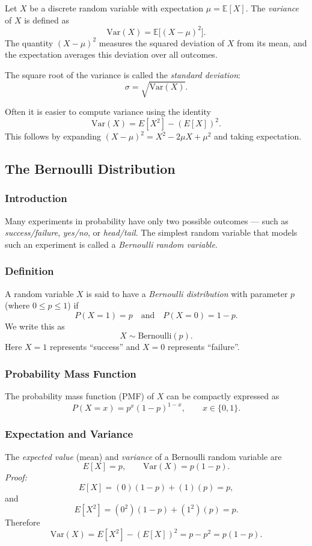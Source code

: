 Let $X$ be a discrete random variable with expectation $\mu = \mathbb{E}[X]$.
The \emph{variance} of $X$ is defined as
\[
\mathrm{Var}(X)
    = \mathbb{E}\big[(X - \mu)^2\big].
\]
The quantity $(X-\mu)^2$ measures the squared deviation of $X$ from its
mean, and the expectation averages this deviation over all outcomes.

\medskip
The square root of the variance is called the \emph{standard deviation}:
\[
\sigma = \sqrt{\mathrm{Var}(X)}.
\]

Often it is easier to compute variance using the identity
\[
\mathrm{Var}(X)
= E[X^2] - (E[X])^2.
\]
This follows by expanding $(X-\mu)^2 = X^2 - 2\mu X + \mu^2$ and taking
expectation.
\subsection{The Bernoulli Distribution}

\subsubsection{Introduction}
Many experiments in probability have only two possible outcomes — such as
\emph{success/failure}, \emph{yes/no}, or \emph{head/tail}. The simplest
random variable that models such an experiment is called a
\emph{Bernoulli random variable}.

\subsubsection{Definition}
A random variable $X$ is said to have a \emph{Bernoulli distribution}
with parameter $p$ (where $0 \le p \le 1$) if
\[
P(X=1)=p \quad \text{and} \quad P(X=0)=1-p.
\]
We write this as
\[
X \sim \text{Bernoulli}(p).
\]
Here $X=1$ represents ``success'' and $X=0$ represents ``failure''.

\subsubsection{Probability Mass Function}
The probability mass function (PMF) of $X$ can be compactly expressed as
\[
P(X=x)=p^x(1-p)^{1-x}, \qquad x \in \{0,1\}.
\]

\subsubsection{Expectation and Variance}
The \emph{expected value} (mean) and \emph{variance} of a Bernoulli random
variable are
\[
E[X] = p, \qquad \text{Var}(X) = p(1-p).
\]
\emph{Proof:}
\[
E[X] = (0)(1-p) + (1)(p) = p,
\]
and
\[
E[X^2] = (0^2)(1-p) + (1^2)(p) = p.
\]
Therefore
\[
\text{Var}(X) = E[X^2] - (E[X])^2 = p - p^2 = p(1-p).
\]

